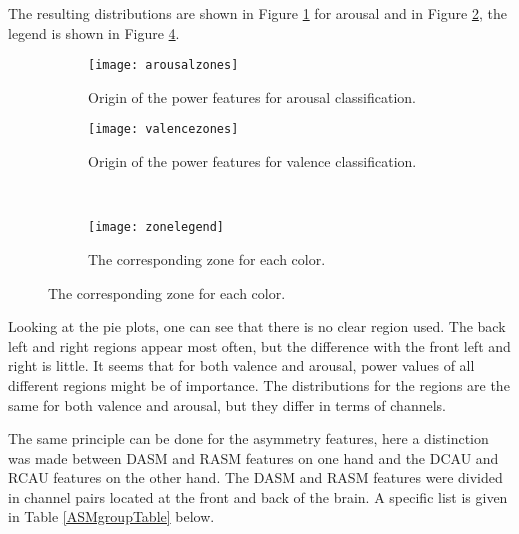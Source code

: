 The resulting distributions are shown in Figure \ref{arousalzones} for arousal and in Figure \ref{valencezones}, the legend is shown in Figure \ref{zonelegend}.

\begin{figure}[H]
\centering
  \begin{subfigure}[b]{.4\textwidth}
    \texttt{[image: arousalzones]}
    \caption{Origin of the power features for arousal classification.\label{arousalzones}}
  \end{subfigure}
\hfill
  \begin{subfigure}[b]{.4\textwidth}
    \texttt{[image: valencezones]}
    \caption{Origin of the power features for valence classification.\label{valencezones}}
  \end{subfigure}
\\
  \begin{subfigure}[b]{.7\textwidth}
    \texttt{[image: zonelegend]}
    \caption{The corresponding zone for each color.\label{zonelegend}}
  \end{subfigure}
\end{figure}

Looking at the pie plots, one can see that there is no clear region used. The back left and right regions appear most often, but the difference with the front left and right is little. It seems that for both valence and arousal, power values of all different regions might be of importance. The distributions for the regions are the same for both valence and arousal, but they differ in terms of channels.

\npar

The same principle can be done for the asymmetry features, here a distinction was made between DASM and RASM features on one hand and the DCAU and RCAU features on the other hand. The DASM and RASM features were divided in channel pairs located at the front and back of the brain. A specific list is given in Table \ref{ASMgroupTable} below.


